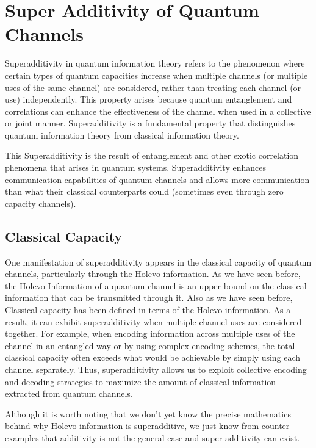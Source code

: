 \section{Super Additivity of Quantum Channels}

Superadditivity in quantum information theory refers to the phenomenon where
certain types of quantum capacities increase when multiple channels (or multiple
uses of the same channel) are considered, rather than treating each channel
(or use) independently. This property arises because quantum entanglement and
correlations can enhance the effectiveness of the channel when used in a
collective or joint manner. Superadditivity is a fundamental property that
distinguishes quantum information theory from classical information theory.

This Superadditivity is the result of entanglement and other exotic correlation
phenomena that arises in quantum systems. Superadditivity enhances
communication capabilities of quantum channels and allows more communication
than what their classical counterparts could (sometimes even through
zero capacity channels).

\subsection{Classical Capacity}
One manifestation of superadditivity appears in the classical capacity of quantum
channels, particularly through the Holevo information. As we have seen before, the
Holevo Information of a quantum channel is an upper bound on the classical information
that can be transmitted through it. Also as we have seen before, Classical capacity
has been defined in terms of the Holevo information. As a result, it can exhibit
superadditivity when multiple channel uses are considered together. For example, when
encoding information across multiple uses of the channel in an entangled way or by
using complex encoding schemes, the total classical capacity often exceeds what would be
achievable by simply using each channel separately. Thus, superadditivity allows us to
exploit collective encoding and decoding strategies to maximize the amount of classical
information extracted from quantum channels.

Although it is worth noting that we don't yet know the precise mathematics behind why
Holevo information is superadditive, we just know from counter examples that additivity
is not the general case and super additivity can exist.

